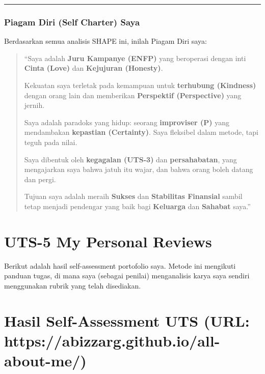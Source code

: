 \documentclass[
  letterpaper,
  DIV=11,
  numbers=noendperiod]{scrreprt}
\begin{document}
\begin{center}\rule{0.5\linewidth}{0.5pt}\end{center}

\subsection{Piagam Diri (Self Charter)
Saya}\label{piagam-diri-self-charter-saya}

Berdasarkan semua analisis SHAPE ini, inilah Piagam Diri saya:

\begin{quote}
``Saya adalah \textbf{Juru Kampanye (ENFP)} yang beroperasi dengan inti
\textbf{Cinta (Love)} dan \textbf{Kejujuran (Honesty)}.

Kekuatan saya terletak pada kemampuan untuk \textbf{terhubung
(Kindness)} dengan orang lain dan memberikan \textbf{Perspektif
(Perspective)} yang jernih.

Saya adalah paradoks yang hidup: seorang \textbf{improviser (P)} yang
mendambakan \textbf{kepastian (Certainty)}. Saya fleksibel dalam metode,
tapi teguh pada nilai.

Saya dibentuk oleh \textbf{kegagalan (UTS-3)} dan \textbf{persahabatan},
yang mengajarkan saya bahwa jatuh itu wajar, dan bahwa orang boleh
datang dan pergi.

Tujuan saya adalah meraih \textbf{Sukses} dan \textbf{Stabilitas
Finansial} sambil tetap menjadi pendengar yang baik bagi
\textbf{Keluarga} dan \textbf{Sahabat} saya.''
\end{quote}


\chapter{UTS-5 My Personal Reviews}\label{uts-5-my-personal-reviews}

Berikut adalah hasil self-assessment portofolio saya. Metode ini
mengikuti panduan tugas, di mana saya (sebagai penilai) menganalisis
karya saya sendiri menggunakan rubrik yang telah disediakan.


\chapter{Hasil Self-Assessment UTS (URL:
https://abizzarg.github.io/all-about-me/)}\label{hasil-self-assessment-uts-url-httpsabizzarg.github.ioall-about-me}
\end{document}
